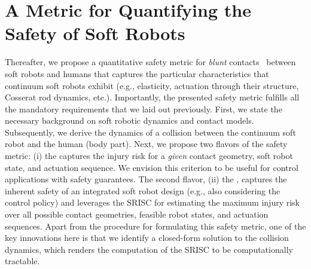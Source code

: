 \section{A Metric for Quantifying the Safety of Soft Robots}
Thereafter, we propose a quantitative safety metric for \emph{blunt} contacts~\citep{haddadin2011safe} between soft robots and humans that captures the particular characteristics that continuum soft robots exhibit (e.g., elasticity, actuation through their structure, Cosserat rod dynamics, etc.).
Importantly, the presented safety metric fulfills all the mandatory requirements that we laid out previously. %
First, we state the necessary background on soft robotic dynamics and contact models. Subsequently, we derive the dynamics of a collision between the continuum soft robot and the human (body part).
Next, we propose two flavors of the safety metric: (i) the  captures the injury risk for a \emph{given} contact geometry, soft robot state, and actuation sequence. We envision this criterion to be useful for control applications with safety guarantees.
The second flavor, (ii) the , captures the inherent safety of an integrated soft robot design (e.g., also considering the control policy) and leverages the \gls{SRISC} for estimating the maximum injury risk over all possible contact geometries, feasible robot states, and actuation sequences.
Apart from the procedure for formulating this safety metric, one of the key innovations here is that we identify a closed-form solution to the collision dynamics, which renders the computation of the \gls{SRISC} to be computationally tractable.

